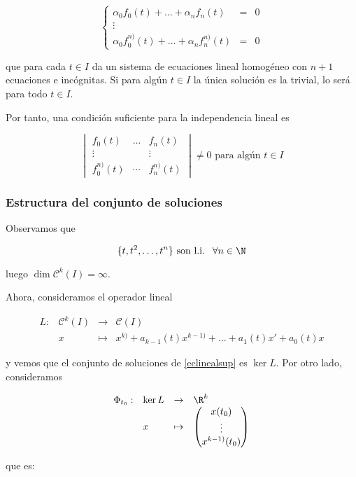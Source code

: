\[
\left\{\begin{array}{lcl}
  \alpha_0 f_0(t) + \dots + \alpha_n f_n(t) & = & 0\\
  \vdots\\
  \alpha_0 f^{n)}_0(t) + \dots + \alpha_n f^{n)}_n(t) & = & 0
\end{array}\right.
\]

que para cada $t\in I$ da un sistema de ecuaciones lineal homogéneo con $n+1$ ecuaciones e incógnitas. Si para
algún $t\in I$ la única solución es la trivial, lo será para todo $t\in I$.

Por tanto, una condición suficiente para la independencia lineal es

\[
\begin{vmatrix}
  f_0(t) & \dots & f_n(t)\\
  \vdots &  & \vdots\\
  f_0^{n)}(t) & \cdots & f_n^{n)}(t)
\end{vmatrix} \ne 0 \text{ para algún } t\in I
\]

\subsubsection{Estructura del conjunto de soluciones}
Observamos que

\[ \{ t, t^2, \dots, t^n \} \text{ son l.i. } \ \forall n\in \N \]

luego $\dim \mathscr{C}^k(I) = \infty$.

Ahora, consideramos el operador lineal

\[
\begin{array}{llll}
  L: & \mathscr{C}^k(I) & \to & \mathscr{C}(I)\\
    & x & \mapsto & x^{k)} + a_{k-1}(t)x^{k-1)} + \dots + a_1(t)x' + a_0(t)x
\end{array}
\]

y vemos que el conjunto de soluciones de \eqref{eclinealsup} es $\ker L$. Por otro lado,
consideramos

\[
\begin{array}{llll}
  \Phi_{t_0}: & \ker L & \to & \R^k\\
    & x & \mapsto & 
  \begin{pmatrix}
    x(t_0)\\
    \vdots\\
    x^{k-1)}(t_0)
  \end{pmatrix}
\end{array}
\]

que es:

